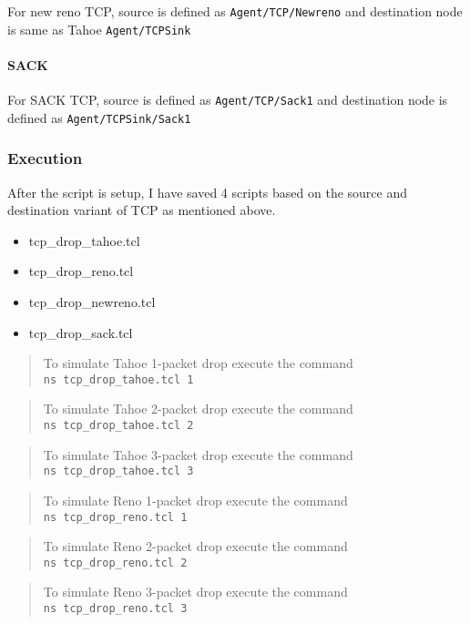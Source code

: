 \documentclass[11pt]{article}
\providecommand{\tightlist}{%
      \setlength{\itemsep}{0pt}\setlength{\parskip}{0pt}}
\begin{document}
For new reno TCP, source is defined as \texttt{Agent/TCP/Newreno} and
destination node is same as Tahoe \texttt{Agent/TCPSink}

\paragraph{SACK}\label{sack}

For SACK TCP, source is defined as \texttt{Agent/TCP/Sack1} and
destination node is defined as \texttt{Agent/TCPSink/Sack1}

    \subsubsection{Execution}\label{execution}

After the script is setup, I have saved 4 scripts based on the source
and destination variant of TCP as mentioned above.

\begin{itemize}
\tightlist
\item
  tcp\_drop\_tahoe.tcl
\item
  tcp\_drop\_reno.tcl
\item
  tcp\_drop\_newreno.tcl
\item
  tcp\_drop\_sack.tcl
\end{itemize}

\begin{quote}
To simulate Tahoe 1-packet drop execute the command
\texttt{ns\ tcp\_drop\_tahoe.tcl\ 1}
\end{quote}

\begin{quote}
To simulate Tahoe 2-packet drop execute the command
\texttt{ns\ tcp\_drop\_tahoe.tcl\ 2}
\end{quote}

\begin{quote}
To simulate Tahoe 3-packet drop execute the command
\texttt{ns\ tcp\_drop\_tahoe.tcl\ 3}
\end{quote}

\begin{quote}
To simulate Reno 1-packet drop execute the command
\texttt{ns\ tcp\_drop\_reno.tcl\ 1}
\end{quote}

\begin{quote}
To simulate Reno 2-packet drop execute the command
\texttt{ns\ tcp\_drop\_reno.tcl\ 2}
\end{quote}

\begin{quote}
To simulate Reno 3-packet drop execute the command
\texttt{ns\ tcp\_drop\_reno.tcl\ 3}
\end{quote}
\end{document}
